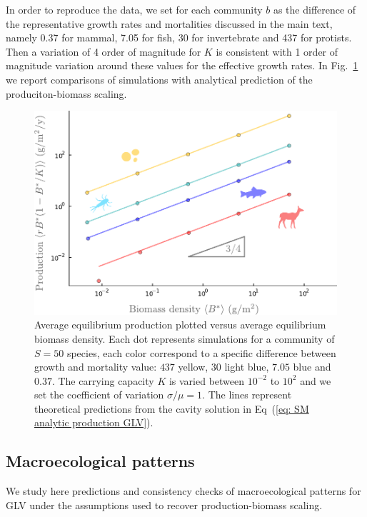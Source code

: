 \documentclass[10pt]{article}
\begin{document}
In order to reproduce the data, we set for each community $b$
as the difference of the representative growth rates 
and mortalities discussed in the
main text, namely 0.37 for mammal, 7.05 for fish, 30 for invertebrate
and 437 for protists. 
Then a variation of 4 order of magnitude for $K$ is consistent with
1 order of magnitude variation around these values for the effective growth rates.
In Fig.~\ref{fig: SM production GLV} we report comparisons of simulations
with analytical prediction of the produciton-biomass scaling.

\begin{figure}[h!]
    \centering
    \includegraphics[width=.8\textwidth]{fig/SM-production-GLV.pdf}
    \caption{Average equilibrium production 
    plotted versus average equilibrium biomass density.
    Each dot represents simulations for a community of $S=50$ species, 
    each color correspond to a specific difference between growth and mortality
    value: $437$ yellow, $30$ light blue,
    $7.05$ blue and $0.37$. The carrying capacity $K$
    is varied between $10^{-2}$ to $10^2$ and we set 
    the coefficient of variation $\sigma/\mu=1$.
    The lines represent theoretical predictions from the
    cavity solution in Eq~(\ref{eq: SM analytic production GLV}).}
    \label{fig: SM production GLV}
\end{figure}

\subsection{Macroecological patterns}
We study here predictions and consistency checks of macroecological patterns
for GLV under the assumptions 
used to recover production-biomass scaling.
\end{document}
